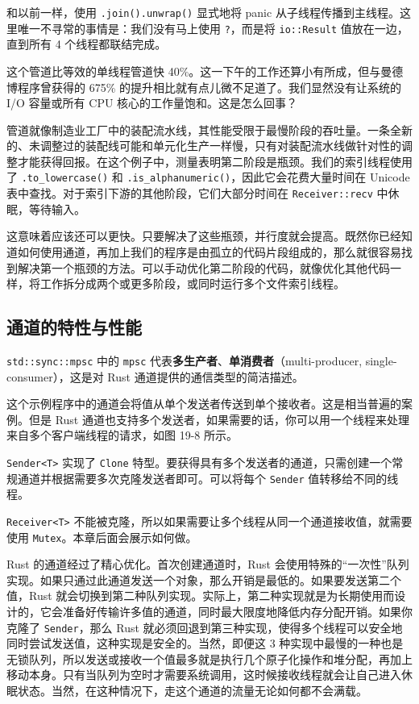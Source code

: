 和以前一样，使用 \texttt{.join().unwrap()} 显式地将 panic 从子线程传播到主线程。这里唯一不寻常的事情是：我们没有马上使用 \texttt{?}，而是将 \texttt{io::Result} 值放在一边，直到所有 4 个线程都联结完成。

这个管道比等效的单线程管道快 40\%。这一下午的工作还算小有所成，但与曼德博程序曾获得的 675\% 的提升相比就有点儿微不足道了。我们显然没有让系统的 I/O 容量或所有 CPU 核心的工作量饱和。这是怎么回事？

管道就像制造业工厂中的装配流水线，其性能受限于最慢阶段的吞吐量。一条全新的、未调整过的装配线可能和单元化生产一样慢，只有对装配流水线做针对性的调整才能获得回报。在这个例子中，测量表明第二阶段是瓶颈。我们的索引线程使用了 \texttt{.to\_lowercase()} 和 \texttt{.is\_alphanumeric()}，因此它会花费大量时间在 Unicode 表中查找。对于索引下游的其他阶段，它们大部分时间在 \texttt{Receiver::recv} 中休眠，等待输入。

这意味着应该还可以更快。只要解决了这些瓶颈，并行度就会提高。既然你已经知道如何使用通道，再加上我们的程序是由孤立的代码片段组成的，那么就很容易找到解决第一个瓶颈的方法。可以手动优化第二阶段的代码，就像优化其他代码一样，将工作拆分成两个或更多阶段，或同时运行多个文件索引线程。

\subsection{通道的特性与性能}

\texttt{std::sync::mpsc} 中的 \texttt{mpsc} 代表\textbf{多生产者}、\textbf{单消费者}（multi-producer, single-consumer），这是对 Rust 通道提供的通信类型的简洁描述。

这个示例程序中的通道会将值从单个发送者传送到单个接收者。这是相当普遍的案例。但是 Rust 通道也支持多个发送者，如果需要的话，你可以用一个线程来处理来自多个客户端线程的请求，如图 19-8 所示。


\texttt{Sender<T>} 实现了 \texttt{Clone} 特型。要获得具有多个发送者的通道，只需创建一个常规通道并根据需要多次克隆发送者即可。可以将每个 \texttt{Sender} 值转移给不同的线程。

\texttt{Receiver<T>} 不能被克隆，所以如果需要让多个线程从同一个通道接收值，就需要使用 \texttt{Mutex}。本章后面会展示如何做。

Rust 的通道经过了精心优化。首次创建通道时，Rust 会使用特殊的“一次性”队列实现。如果只通过此通道发送一个对象，那么开销是最低的。如果要发送第二个值，Rust 就会切换到第二种队列实现。实际上，第二种实现就是为长期使用而设计的，它会准备好传输许多值的通道，同时最大限度地降低内存分配开销。如果你克隆了 \texttt{Sender}，那么 Rust 就必须回退到第三种实现，使得多个线程可以安全地同时尝试发送值，这种实现是安全的。当然，即便这 3 种实现中最慢的一种也是无锁队列，所以发送或接收一个值最多就是执行几个原子化操作和堆分配，再加上移动本身。只有当队列为空时才需要系统调用，这时候接收线程就会让自己进入休眠状态。当然，在这种情况下，走这个通道的流量无论如何都不会满载。

